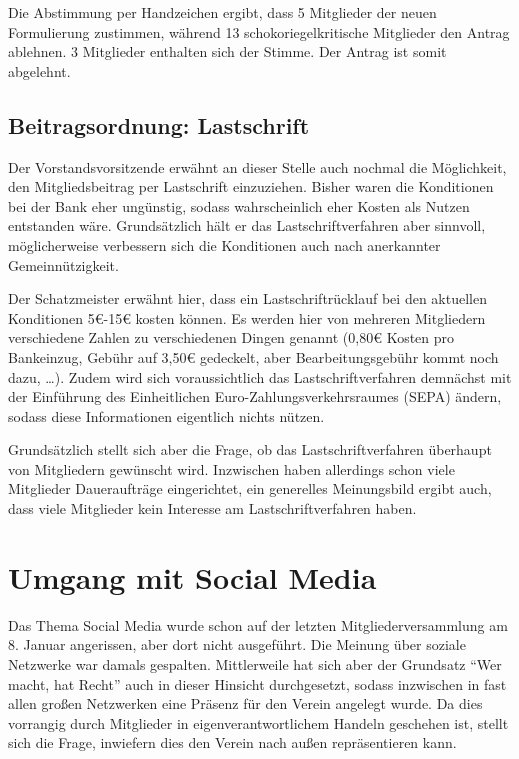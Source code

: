\documentclass[a4paper,12pt]{scrartcl}
\begin{document}
Die Abstimmung per Handzeichen ergibt, dass 5 Mitglieder der neuen Formulierung
zustimmen, während 13 schokoriegelkritische Mitglieder den Antrag ablehnen. 3
Mitglieder enthalten sich der Stimme. Der Antrag ist somit abgelehnt.

\subsection{Beitragsordnung: Lastschrift}
Der Vorstandsvorsitzende erwähnt an dieser Stelle auch nochmal die Möglichkeit,
den Mitgliedsbeitrag per Lastschrift einzuziehen. Bisher waren die Konditionen
bei der Bank eher ungünstig, sodass wahrscheinlich eher Kosten als Nutzen
entstanden wäre. Grundsätzlich hält er das Lastschriftverfahren aber sinnvoll,
möglicherweise verbessern sich die Konditionen auch nach anerkannter
Gemeinnützigkeit.

Der Schatzmeister erwähnt hier, dass ein Lastschriftrücklauf bei den aktuellen
Konditionen 5€-15€ kosten können. Es werden hier von mehreren Mitgliedern
verschiedene Zahlen zu verschiedenen Dingen genannt (0{,}80€ Kosten pro
Bankeinzug, Gebühr auf 3{,}50€ gedeckelt, aber Bearbeitungsgebühr kommt noch
dazu, \ldots). Zudem wird sich voraussichtlich das Lastschriftverfahren
demnächst mit der Einführung des Einheitlichen Euro-Zahlungsverkehrsraumes
(SEPA) ändern, sodass diese Informationen eigentlich nichts nützen.

Grundsätzlich stellt sich aber die Frage, ob das Lastschriftverfahren überhaupt
von Mitgliedern gewünscht wird. Inzwischen haben allerdings schon viele
Mitglieder Daueraufträge eingerichtet, ein generelles Meinungsbild ergibt auch,
dass viele Mitglieder kein Interesse am Lastschriftverfahren haben.

\section{Umgang mit Social Media}\label{top:socialmedia}
Das Thema Social Media wurde schon auf der letzten Mitgliederversammlung am 8.
Januar angerissen, aber dort nicht ausgeführt. Die Meinung über soziale
Netzwerke war damals gespalten. Mittlerweile hat sich aber der Grundsatz "`Wer
macht, hat Recht"' auch in dieser Hinsicht durchgesetzt, sodass inzwischen in
fast allen großen Netzwerken eine Präsenz für den Verein angelegt wurde. Da dies
vorrangig durch Mitglieder in eigenverantwortlichem Handeln geschehen ist,
stellt sich die Frage, inwiefern dies den Verein nach außen repräsentieren
kann.
\end{document}
